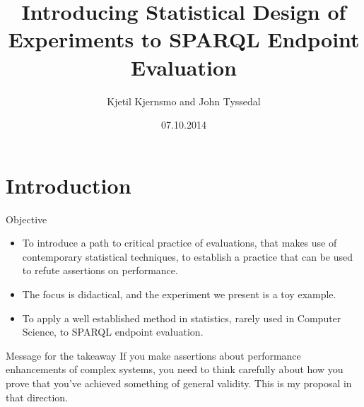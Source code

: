 \documentclass[english,usenames,dvipsnames,aspectratio=169]{beamer}
\begin{document}
\title[DoE in SPARQL Evaluations]{Introducing Statistical Design of Experiments to SPARQL Endpoint Evaluation}
\subtitle{}
\author{Kjetil Kjernsmo and John Tyssedal}
\date{07.10.2014}
\maketitle

\section{Introduction} 

\begin{frame}{Objective}
  \begin{itemize}
  \item To introduce a path to critical practice of evaluations, that makes
use of contemporary statistical techniques, to establish a practice
that can be used to refute assertions on performance.
\item The focus is didactical, and the experiment we present is a toy
example.
\item To apply a well established method in statistics, rarely used in
  Computer Science, to SPARQL endpoint evaluation.

  \end{itemize}

  \begin{block}{Message for the takeaway}
    If you make assertions about performance enhancements of complex
    systems, you need to think carefully about how you prove that 
    you've achieved something of general validity. This is my proposal
    in that direction.
  \end{block}

\end{frame}
\end{document}
